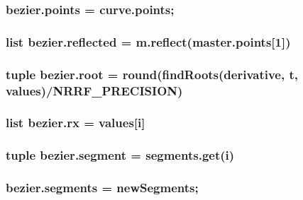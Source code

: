 \subsubsection[{points}]{\setlength{\rightskip}{0pt plus 5cm}bezier.\+points = curve.\+points;}\label{namespacebezier_a83cd11a8fa14a0feb1b8bf9beb29f92d}
\hypertarget{namespacebezier_a73a62826780aabf596dcf302d422c619}{}
\subsubsection[{reflected}]{\setlength{\rightskip}{0pt plus 5cm}list bezier.\+reflected = m.\+reflect(master.\+points\mbox{[}1\mbox{]})}\label{namespacebezier_a73a62826780aabf596dcf302d422c619}
\hypertarget{namespacebezier_a64145e7ef3e125162f1139dd32325fa1}{}
\subsubsection[{root}]{\setlength{\rightskip}{0pt plus 5cm}tuple bezier.\+root = round(find\+Roots(derivative, {\bf t}, {\bf values})/N\+R\+R\+F\+\_\+\+P\+R\+E\+C\+I\+S\+I\+O\+N)}\label{namespacebezier_a64145e7ef3e125162f1139dd32325fa1}
\hypertarget{namespacebezier_a1842cea8a4b02363c663c007716e5837}{}
\subsubsection[{rx}]{\setlength{\rightskip}{0pt plus 5cm}list bezier.\+rx = {\bf values}\mbox{[}{\bf i}\mbox{]}}\label{namespacebezier_a1842cea8a4b02363c663c007716e5837}
\hypertarget{namespacebezier_ae4beec9a717adf1c578294a19edbca65}{}
\subsubsection[{segment}]{\setlength{\rightskip}{0pt plus 5cm}tuple bezier.\+segment = segments.\+get({\bf i})}\label{namespacebezier_ae4beec9a717adf1c578294a19edbca65}
\hypertarget{namespacebezier_af5dc7bac630ffee9827391cfaac1e06b}{}
\subsubsection[{segments}]{\setlength{\rightskip}{0pt plus 5cm}bezier.\+segments = new\+Segments;}\label{namespacebezier_af5dc7bac630ffee9827391cfaac1e06b}
\hypertarget{namespacebezier_a21309dd6a23cee0f4b3888de7b66b7ff}{}
